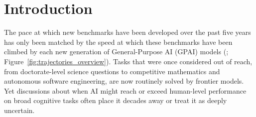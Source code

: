 \documentclass[letterpaper,twocolumn]{article}
\begin{document}
\section{Introduction}
\label{sec:introduction}

The pace at which new benchmarks have been developed over the past five years has only been matched by the speed at which these benchmarks have been climbed by each new generation of General-Purpose AI (GPAI) models (\citet{epoch_ai_ai_2024, bengio_international_2025, aisi_frontier_2025}; Figure~\ref{fig:trajectories_overview}).
Tasks that were once considered out of reach, from doctorate-level science questions to competitive mathematics and autonomous software engineering, are now routinely solved by frontier models.
Yet discussions about when AI might reach or exceed human-level performance on broad cognitive tasks often place it decades away \citep{grace_when_2018, grace_thousands_2025} or treat it as deeply uncertain.
\end{document}
